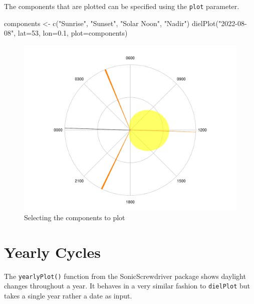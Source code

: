 \documentclass[
]{book}
\newenvironment{Shaded}{\begin{snugshade}}{\end{snugshade}}
\newcommand{\AttributeTok}[1]{\textcolor[rgb]{0.77,0.63,0.00}{#1}}
\newcommand{\DecValTok}[1]{\textcolor[rgb]{0.00,0.00,0.81}{#1}}
\newcommand{\FloatTok}[1]{\textcolor[rgb]{0.00,0.00,0.81}{#1}}
\newcommand{\FunctionTok}[1]{\textcolor[rgb]{0.00,0.00,0.00}{#1}}
\newcommand{\NormalTok}[1]{#1}
\newcommand{\OtherTok}[1]{\textcolor[rgb]{0.56,0.35,0.01}{#1}}
\newcommand{\StringTok}[1]{\textcolor[rgb]{0.31,0.60,0.02}{#1}}
\begin{document}
The components that are plotted can be specified using the \texttt{plot} parameter.

\begin{Shaded}
\begin{Highlighting}[]
\NormalTok{components }\OtherTok{\textless{}{-}} \FunctionTok{c}\NormalTok{(}\StringTok{"Sunrise"}\NormalTok{, }\StringTok{"Sunset"}\NormalTok{, }\StringTok{"Solar Noon"}\NormalTok{, }\StringTok{"Nadir"}\NormalTok{)}
\FunctionTok{dielPlot}\NormalTok{(}\StringTok{"2022{-}08{-}08"}\NormalTok{, }\AttributeTok{lat=}\DecValTok{53}\NormalTok{, }\AttributeTok{lon=}\FloatTok{0.1}\NormalTok{, }\AttributeTok{plot=}\NormalTok{components)}
\end{Highlighting}
\end{Shaded}

\begin{figure}

{\centering \includegraphics[width=0.9\linewidth]{_main_files/figure-latex/diel-plot-components-1} 

}

\caption{Selecting the components to plot}\label{fig:diel-plot-components}
\end{figure}

\hypertarget{yearly-cycles}{%
\section{Yearly Cycles}\label{yearly-cycles}}

The \texttt{yearlyPlot()} function from the SonicScrewdriver package shows daylight changes throughout a year. It behaves in a very similar fashion to \texttt{dielPlot} but takes a single year rather a date as input.
\end{document}
